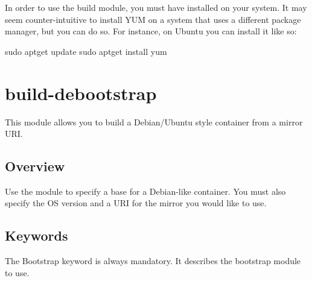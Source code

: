 \documentclass[letterpaper,10pt,english]{sphinxmanual}
\begin{document}
In order to use the  build module, you must have  installed on your system. It may seem counter-intuitive to install YUM on a system
that uses a different package manager, but you can do so. For instance, on Ubuntu you can install it like so:

%
\begin{sphinxVerbatim}[commandchars=\\\{\}]
\PYGZdl{} sudo apt\PYGZhy{}get update \PYGZam{}\PYGZam{} sudo apt\PYGZhy{}get install yum
\end{sphinxVerbatim}


\section{build-debootstrap}
\label{\detokenize{appendix:build-debootstrap}}\label{\detokenize{appendix:sec-build-debootstrap}}
This module allows you to build a Debian/Ubuntu style container from a mirror URI.


\subsection{Overview}
\label{\detokenize{appendix:id11}}
Use the  module to specify a base for a Debian-like container. You must also specify the OS version and a URI for the mirror you would like to use.


\subsection{Keywords}
\label{\detokenize{appendix:id12}}
%
\begin{sphinxVerbatim}[commandchars=\\\{\}]
 
\end{sphinxVerbatim}

The Bootstrap keyword is always mandatory. It describes the bootstrap module to use.

%
\begin{sphinxVerbatim}[commandchars=\\\{\}]
 
\end{sphinxVerbatim}
\end{document}
